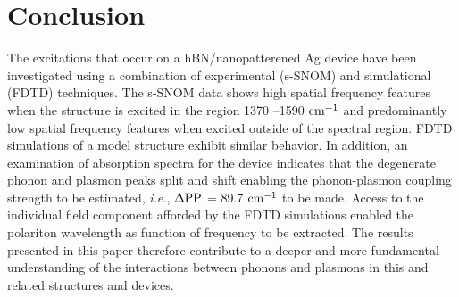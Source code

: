 \documentclass[
peprint,
amsmath,amssymb,
aip,
jap,
floatfix,
]{revtex4-2}
\begin{document}
  \section{Conclusion}
  \label{sec:conclusion}
    The excitations that occur on a hBN/nanopatterened Ag device have been investigated using a combination of experimental (s-SNOM) and simulational (FDTD) techniques. The s-SNOM data shows high spatial frequency features when the structure is excited in the region 1370 –1590 $\rm cm^{-1}$  and predominantly low spatial frequency features when excited outside of the spectral region. FDTD simulations of a model structure exhibit similar behavior. In addition, an examination of absorption spectra for the device indicates that the degenerate phonon and plasmon peaks split and shift enabling the phonon-plasmon coupling strength to be estimated, \textit{i.e.}, $\Delta{\rm{PP}}$ = 89.7 $\rm cm^{-1}$  to be made. Access to the individual field component afforded by the FDTD simulations enabled the polariton wavelength as function of frequency to be extracted. The results presented in this paper therefore contribute to a deeper and more fundamental understanding of the interactions between phonons and plasmons in this and related structures and devices.


\end{document}
